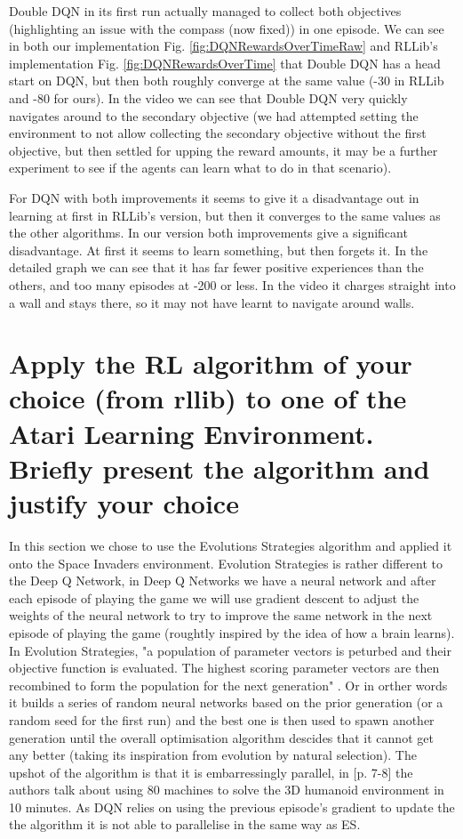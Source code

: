\documentclass[a4pape, 11pt, english]{article}
\begin{document}
Double DQN in its first run actually managed to collect both objectives (highlighting an issue with the compass (now fixed)) in one episode. We can see in both our implementation Fig. \ref{fig:DQNRewardsOverTimeRaw} and RLLib's implementation Fig. \ref{fig:DQNRewardsOverTime} that Double DQN has a head start on DQN, but then both roughly converge at the same value (-30 in RLLib and -80 for ours). In the video we can see that Double DQN very quickly navigates around to the secondary objective (we had attempted setting the environment to not allow collecting the secondary objective without the first objective, but then settled for upping the reward amounts, it may be a further experiment to see if the agents can learn what to do in that scenario).

For DQN with both improvements it seems to give it a disadvantage out in learning at first in RLLib's version, but then it converges to the same values as the other algorithms. In our version both improvements give a significant disadvantage. At first it seems to learn something, but then forgets it. In the detailed graph we can see that it has far fewer positive experiences than the others, and too many episodes at -200 or less. In the video it charges straight into a wall and stays there, so it may not have learnt to navigate around walls.

\section{Apply the RL algorithm of your choice (from rllib) to one of the Atari Learning Environment. Briefly present the algorithm and justify your choice}
In this section we chose to use the Evolutions Strategies algorithm and applied it onto the Space Invaders environment. Evolution Strategies is rather different to the Deep Q Network, in Deep Q Networks we have a neural network and after each episode of playing the game we will use gradient descent to adjust the weights of the neural network to try to improve the same network in the next episode of playing the game (roughtly inspired by the idea of how a brain learns). In Evolution Strategies, "a population of parameter vectors is peturbed and their objective function is evaluated. The highest scoring parameter vectors are then recombined to form the population for the next generation" \citep{salimans_evolution_2017}. Or in orther words it builds a series of random neural networks based on the prior generation (or a random seed for the first run) and the best one is then used to spawn another generation until the overall optimisation algorithm descides that it cannot get any better (taking its inspiration from evolution by natural selection).
The upshot of the algorithm is that it is embarressingly parallel, in  \citep{salimans_evolution_2017}[p. 7-8] the authors talk about using 80 machines to solve the 3D humanoid environment in 10 minutes. As DQN relies on using the previous episode's gradient to update the the algorithm it is not able to parallelise in the same way as ES.
\end{document}
